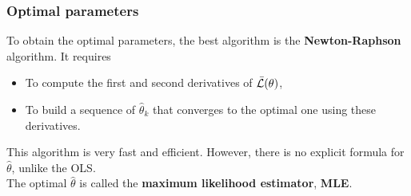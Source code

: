 \begin{frame}
\frametitle{Optimal parameters}
To obtain the optimal parameters, the best algorithm is the {\bf Newton-Raphson} algorithm. It requires 
\begin{itemize}
\item To compute the first and second derivatives of $\bar{\cal L}(\theta)$,
\item To build a sequence of $\hat{\theta}_k$ that converges to the optimal one using these derivatives. 
\end{itemize}
This algorithm is very fast and efficient. However, there is no explicit formula for $\hat{\theta}$, unlike the OLS.\\
\vspace{0.3cm}
The optimal $\hat{\theta}$ is called the {\bf maximum likelihood estimator}, {\bf MLE}. 
\end{frame}
